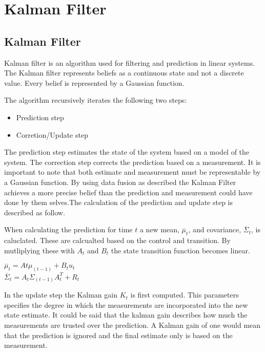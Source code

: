 \chapter{Kalman Filter}
\label{chp:kalman}

\section{Kalman Filter}
Kalman filter is an algorithm used for filtering and prediction in linear systems. The Kalman filter represents beliefs as a continuous state and not a discrete value. Every belief is represented by a Gaussian function.

The algorithm recursively iterates the following two steps:

\begin{itemize}
	\item Prediction step
	\item Corretion/Update step
\end{itemize}

The prediction step estimates the state of the system based on a model of the system. The correction step corrects the prediction based on a measurement. It is important to note that both estimate and measurement must be representable by a Gaussian function. By using data fusion as described the Kalman Filter achieves a more precise belief than the prediction and measurement could have done by them selves.The calculation of the prediction and update step is described as follow.

When calculating the prediction for time $t$ a new mean, $\overline{\mu}_t$, and covariance, $\overline{\Sigma}_t$, is caluclated. These are calcualted based on the control and transition. By mutliplying these with $A_t$ and $B_t$ the state transition function becomes linear.

\begin{center}
$\overline{\mu}_t = At \mu_(t-1)+B_t u_t$  \\
$\overline{\Sigma}_t = A_t \Sigma_(t-1) A^T_t+R_t $ \\
\end{center}

In the update step the Kalman gain $K_t$ is first computed. This parameters specifies the degree in which the measurements are incorporated into the new state estimate. It could be said that the kalman gain describes how much the measurements are trusted over the prediction. A Kalman gain of one would mean that the prediction is ignored and the final estimate only is based on the measurement.

